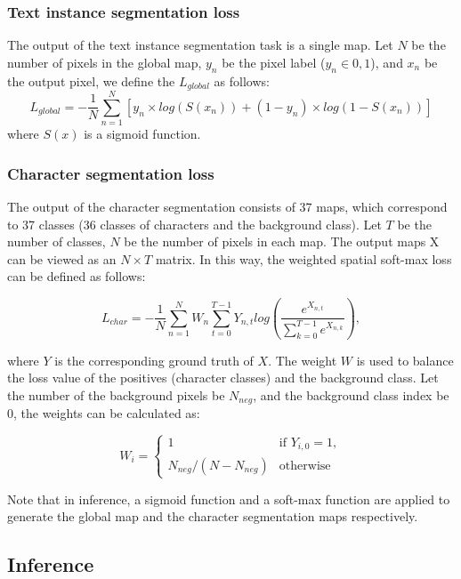 \documentclass[runningheads]{llncs}
\begin{document}
\subsubsection{Text instance segmentation loss}
The output of the text instance segmentation task is a single map. Let $N$ be the number of pixels in the global map, $y_n$ be the pixel label ($y_n \in {0,1}$), and $x_n$ be the output pixel, we define the $L_{global}$ as follows:
\begin{equation}
L_{global} = -\frac{1}{N}\sum_{n=1}^{N}\left [ y_n \times log(S(x_n)) + (1-y_n) \times log(1- S(x_n)) \right ]
\end{equation}
where $S(x)$ is a sigmoid function.


\subsubsection{Character segmentation loss}
The output of the character segmentation consists of 37 maps, which correspond to 37 classes (36 classes of characters and the background class). Let $T$ be the number of classes, $N$ be the number of pixels in each map. The output maps X can be viewed as an $N \times T$ matrix. In this way, the weighted spatial soft-max loss can be defined as follows:

\begin{equation}
L_{char} = -\frac{1}{N}\sum_{n=1}^{N}W_n\sum_{t=0}^{T-1} Y_{n,t} log(\frac{e^{X_{n,t}}}{\sum_{k=0}^{T-1} e^{X_{n,k}}}),
\end{equation}

where $Y$ is the corresponding ground truth of $X$. The weight $W$ is used to balance the loss value of the positives (character classes) and the background class. Let the number of the background pixels be $N_{neg}$, and the background class index be $0$, the weights can be calculated as:

\begin{equation}
  W_i = 
  \begin{cases}
    1& \text{if } Y_{i,0}=1, \\
    N_{neg} / (N - N_{neg})& \text{otherwise}
  \end{cases}
\end{equation}


Note that in inference, a sigmoid function and a soft-max function are applied to generate the global map and the character segmentation maps respectively.


\subsection{Inference}
\end{document}
